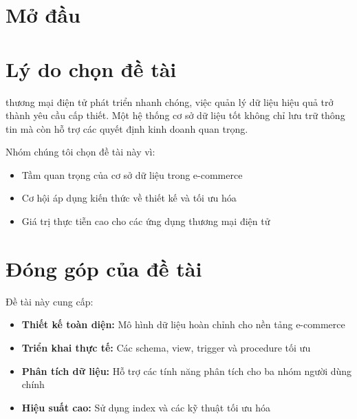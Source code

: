 \section*{Mở đầu}

\section*{Lý do chọn đề tài}

 thương mại điện tử phát triển nhanh chóng, việc quản lý dữ liệu hiệu quả trở thành yêu cầu cấp thiết. Một hệ thống cơ sở dữ liệu tốt không chỉ lưu trữ thông tin mà còn hỗ trợ các quyết định kinh doanh quan trọng.

Nhóm chúng tôi chọn đề tài này vì:
\begin{itemize}
    \item Tầm quan trọng của cơ sở dữ liệu trong e-commerce
    \item Cơ hội áp dụng kiến thức về thiết kế và tối ưu hóa
    \item Giá trị thực tiễn cao cho các ứng dụng thương mại điện tử
\end{itemize}

\section*{Đóng góp của đề tài}

Đề tài này cung cấp:

\begin{itemize}
    \item \textbf{Thiết kế toàn diện:} Mô hình dữ liệu hoàn chỉnh cho nền tảng e-commerce
    \item \textbf{Triển khai thực tế:} Các schema, view, trigger và procedure tối ưu
    \item \textbf{Phân tích dữ liệu:} Hỗ trợ các tính năng phân tích cho ba nhóm người dùng chính
    \item \textbf{Hiệu suất cao:} Sử dụng index và các kỹ thuật tối ưu hóa
\end{itemize}
